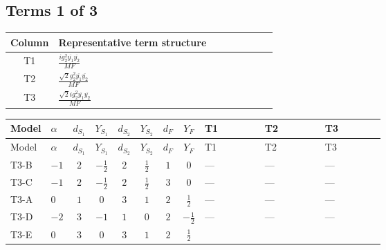 \documentclass[8pt]{article}
\begin{document}
\begin{landscape}
\subsection*{Terms 1 of 3}
\begin{center}
\begin{tabular}{@{}c >{\raggedright\arraybackslash}p{0.82\linewidth}@{}}
\toprule
Column & Representative term structure \\
\midrule
T1 & \(\displaystyle \frac{i g_{2}^{2} \overline{y_{1}} \overline{y_{2}}}{MF}\) \\
\midrule
T2 & \(\displaystyle \frac{\sqrt{2} g_{2}^{2} \overline{y_{1}} \overline{y_{2}}}{MF}\) \\
\midrule
T3 & \(\displaystyle \frac{\sqrt{2} i g_{2}^{2} \overline{y_{1}} \overline{y_{2}}}{MF}\) \\
\midrule
\bottomrule
\end{tabular}
\end{center}
\smallskip
\tiny
\begin{longtable}{@{}llcccccc >{\raggedright\arraybackslash}p{0.21\linewidth} >{\raggedright\arraybackslash}p{0.21\linewidth} >{\raggedright\arraybackslash}p{0.21\linewidth}@{}}
\toprule
Model & $\alpha$ & $d_{S_1}$ & $Y_{S_1}$ & $d_{S_2}$ & $Y_{S_2}$ & $d_F$ & $Y_F$ & T1 & T2 & T3 \\
\midrule
\endfirsthead
\toprule
Model & $\alpha$ & $d_{S_1}$ & $Y_{S_1}$ & $d_{S_2}$ & $Y_{S_2}$ & $d_F$ & $Y_F$ & T1 & T2 & T3 \\
\midrule
\endhead
T3-B & $-1$ & $2$ & $-\frac{1}{2}$ & $2$ & $\frac{1}{2}$ & $1$ & $0$ & --- & --- & --- \\
\midrule
T3-C & $-1$ & $2$ & $-\frac{1}{2}$ & $2$ & $\frac{1}{2}$ & $3$ & $0$ & --- & --- & --- \\
\midrule
T3-A & $0$ & $1$ & $0$ & $3$ & $1$ & $2$ & $\frac{1}{2}$ & --- & --- & --- \\
\midrule
T3-D & $-2$ & $3$ & $-1$ & $1$ & $0$ & $2$ & $-\frac{1}{2}$ & --- & --- & --- \\
\midrule
T3-E & $0$ & $3$ & $0$ & $3$ & $1$ & $2$ & $\frac{1}{2}$ & \scriptsize\adjustbox{max width=\linewidth}{$\begin{gathered} - \frac{i g_{2}^{2} \overline{y_{1}} \overline{y_{2}}}{MF}\end{gathered}$} & \scriptsize\adjustbox{max width=\linewidth}{$\begin{gathered} - \frac{\sqrt{2} g_{2}^{2} \overline{y_{1}} \overline{y_{2}}}{4 MF}\end{gathered}$} & \scriptsize\adjustbox{max width=\linewidth}{$\begin{gathered} - \frac{49 \sqrt{2} i g_{2}^{2} \overline{y_{1}} \overline{y_{2}}}{16 MF}\end{gathered}$} \\
\midrule
\bottomrule
\end{longtable}
\clearpage

\end{landscape}
\end{document}
